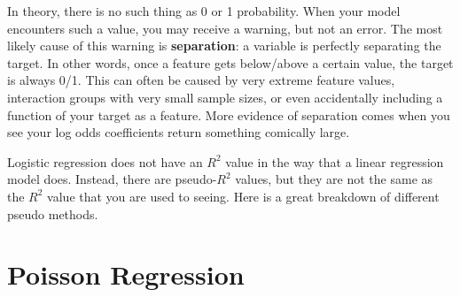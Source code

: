 \documentclass[
  letterpaper,
]{krantz}
\begin{document}
\begin{tcolorbox}[enhanced jigsaw, toprule=.15mm, colback=white, breakable, rightrule=.15mm, arc=.35mm, bottomrule=.15mm, opacityback=0, colframe=quarto-callout-important-color-frame, leftrule=.75mm, left=2mm]
\begin{minipage}[t]{5.5mm}
\textcolor{quarto-callout-important-color}{\faExclamation}
\end{minipage}%
\begin{minipage}[t]{\textwidth - 5.5mm}

In theory, there is no such thing as 0 or 1 probability. When your model
encounters such a value, you may receive a warning, but not an error.
The most likely cause of this warning is \textbf{separation}: a variable
is perfectly separating the target. In other words, once a feature gets
below/above a certain value, the target is always 0/1. This can often be
caused by very extreme feature values, interaction groups with very
small sample sizes, or even accidentally including a function of your
target as a feature. More evidence of separation comes when you see your
log odds coefficients return something comically large.

\end{minipage}%
\end{tcolorbox}

\begin{tcolorbox}[enhanced jigsaw, toprule=.15mm, colback=white, breakable, rightrule=.15mm, arc=.35mm, bottomrule=.15mm, opacityback=0, colframe=quarto-callout-warning-color-frame, leftrule=.75mm, left=2mm]
\begin{minipage}[t]{5.5mm}
\textcolor{quarto-callout-warning-color}{\faExclamationTriangle}
\end{minipage}%
\begin{minipage}[t]{\textwidth - 5.5mm}

Logistic regression does not have an \(R^2\) value in the way that a
linear regression model does. Instead, there are pseudo-\(R^2\) values,
but they are not the same as the \(R^2\) value that you are used to
seeing. Here is a great breakdown of different pseudo methods.

\end{minipage}%
\end{tcolorbox}

\section{Poisson Regression}\label{sec-glm-poisson}
\end{document}

